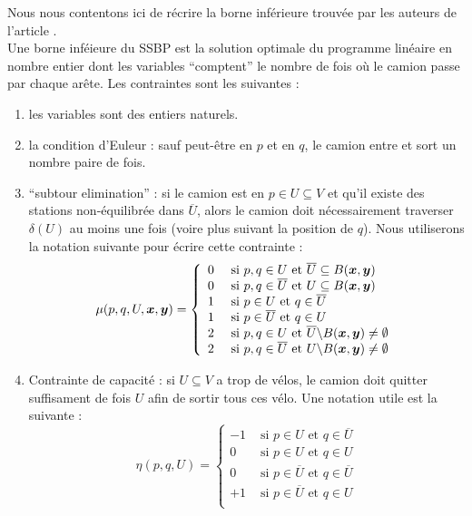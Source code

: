 Nous nous contentons ici de récrire la borne inférieure trouvée par les auteurs de l'article \cite{Benchimol2011}.
\\

Une borne inféieure du SSBP est la solution optimale du programme linéaire en nombre entier dont les variables ``comptent'' le nombre de fois où le camion passe par chaque arête. Les contraintes sont les suivantes :
\begin{enumerate}[label=(\roman*)]
\item les variables sont des entiers naturels.
\item la condition d'Euleur : sauf peut-être en $p$ et en $q$, le camion entre et sort un nombre paire de fois.
\item ``subtour elimination'' : si le camion est en $p \in U \subseteq V $ et qu'il existe des stations non-équilibrée dans $\overline{U}$, alors le camion doit nécessairement traverser $\delta(U)$ au moins une fois (voire plus suivant la position de $q$). Nous utiliserons la notation suivante pour écrire cette contrainte :
\[
\mu(p,q,U,\boldsymbol{x},\boldsymbol{y}) = \left\{
\begin{array}{ll}
  0 &\mbox{ si } p,q \in U            \mbox{ et } \overline{U} \subseteq B(\boldsymbol{x},\boldsymbol{y})\\
  0 &\mbox{ si } p,q \in \overline{U} \mbox{ et } U \subseteq B(\boldsymbol{x},\boldsymbol{y})\\
  1 &\mbox{ si } p \in U              \mbox{ et } q \in \overline{U}\\
  1 &\mbox{ si } p \in \overline{U}   \mbox{ et } q \in U\\
  2 &\mbox{ si } p,q \in U            \mbox{ et } \overline{U} \backslash B(\boldsymbol{x},\boldsymbol{y}) \ne \emptyset\\
  2 &\mbox{ si } p,q \in \overline{U} \mbox{ et } U \backslash B(\boldsymbol{x},\boldsymbol{y}) \ne \emptyset
\end{array}
\right.
\]
\item Contrainte de capacité : si $U \subseteq V$ a trop de vélos, le camion doit quitter suffisament de fois $U$ afin de sortir tous ces vélo. Une notation utile est la suivante :
\[
\eta(p,q,U) = \left\{
\begin{array}{ll}
  -1 &\mbox{ si } p \in U            \mbox{ et } q \in \overline{U}\\
  0  &\mbox{ si } p \in U            \mbox{ et } q \in U\\
  0  &\mbox{ si } p \in \overline{U} \mbox{ et } q \in \overline{U}\\
  +1 &\mbox{ si } p \in \overline{U} \mbox{ et } q \in U\\
\end{array}
\right.
\]
\end{enumerate}

